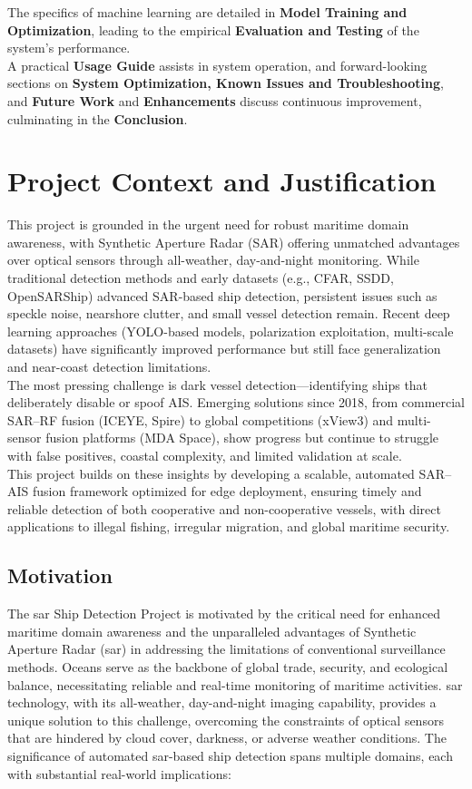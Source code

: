 \documentclass{article}
\begin{document}
	The specifics of machine learning are detailed in \textbf{Model Training and Optimization}, leading to the empirical \textbf{Evaluation and Testing} of the system's performance. \\
	
	A practical \textbf{Usage Guide} assists in system operation, and forward-looking sections on \textbf{System Optimization, Known Issues and Troubleshooting}, and \textbf{Future Work} and \textbf{Enhancements} discuss continuous improvement, culminating in the \textbf{Conclusion}. \newpage 
	
	\section{Project Context and Justification}
	This project is grounded in the urgent need for robust maritime domain awareness, with Synthetic Aperture Radar (SAR) offering unmatched advantages over optical sensors through all-weather, day-and-night monitoring. 
	While traditional detection methods and early datasets (e.g., CFAR, SSDD, OpenSARShip) advanced SAR-based ship detection, persistent issues such as speckle noise, nearshore clutter, and small vessel detection remain. Recent deep learning approaches (YOLO-based models, polarization exploitation, multi-scale datasets) have significantly improved performance but still face generalization and near-coast detection limitations. \\
	
	The most pressing challenge is dark vessel detection—identifying ships that deliberately disable or spoof AIS. Emerging solutions since 2018, from commercial SAR–RF fusion (ICEYE, Spire) to global competitions (xView3) and multi-sensor fusion platforms (MDA Space), show progress but continue to struggle with false positives, coastal complexity, and limited validation at scale. \\
	
	This project builds on these insights by developing a scalable, automated SAR–AIS fusion framework optimized for edge deployment, ensuring timely and reliable detection of both cooperative and non-cooperative vessels, with direct applications to illegal fishing, irregular migration, and global maritime security.
	
	
	\subsection{Motivation}
	The \acrshort{sar} Ship Detection Project is motivated by the critical need for enhanced maritime domain awareness and the unparalleled advantages of Synthetic Aperture Radar (\acrshort{sar}) in addressing the limitations of conventional surveillance methods. Oceans serve as the backbone of global trade, security, and ecological balance, necessitating reliable and real-time monitoring of maritime activities. \acrshort{sar} technology, with its all-weather, day-and-night imaging capability, provides a unique solution to this challenge, overcoming the constraints of optical sensors that are hindered by cloud cover, darkness, or adverse weather conditions. The significance of automated \acrshort{sar}-based ship detection spans multiple domains, each with substantial real-world implications:
	
\end{document}
